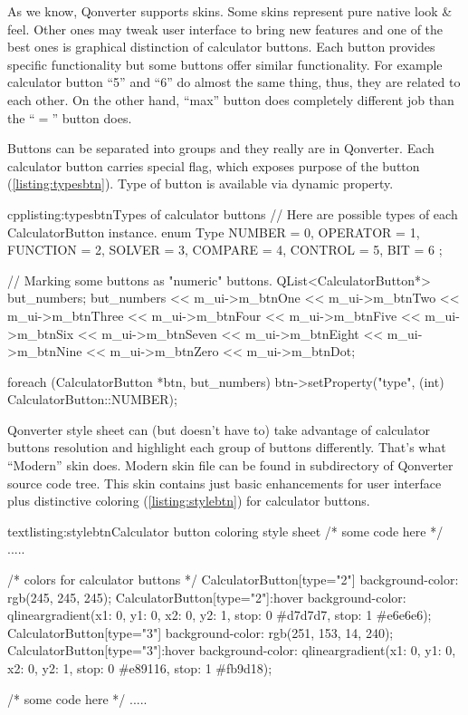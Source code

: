 As we know, Qonverter supports skins. Some skins represent pure native look \& feel. Other ones may tweak user interface to bring new features and one of the best ones is graphical distinction of calculator buttons. Each button provides specific functionality but some buttons offer similar functionality. For example calculator button \enquote{5} and \enquote{6} do almost the same thing, thus, they are related to each other. On the other hand, \enquote{max} button does completely different job than the \enquote{$=$} button does.

Buttons can be separated into groups and they really are in Qonverter. Each calculator button carries special flag, which exposes purpose of the button (\autoref{listing:typesbtn}). Type of button is available via dynamic property.
\begin{fdoccode}{cpp}{listing:typesbtn}{Types of calculator buttons}
// Here are possible types of each CalculatorButton instance.
enum Type {
    NUMBER	= 0,
    OPERATOR	= 1,
    FUNCTION	= 2,
    SOLVER	= 3,
    COMPARE	= 4,
    CONTROL	= 5,
    BIT		= 6
};

// Marking some buttons as "numeric" buttons.
QList<CalculatorButton*> but_numbers;
but_numbers <<	m_ui->m_btnOne << m_ui->m_btnTwo <<
				m_ui->m_btnThree << m_ui->m_btnFour <<
				m_ui->m_btnFive << m_ui->m_btnSix <<
				m_ui->m_btnSeven << m_ui->m_btnEight <<
				m_ui->m_btnNine << m_ui->m_btnZero <<
				m_ui->m_btnDot;

foreach (CalculatorButton *btn, but_numbers) {
	btn->setProperty("type", (int) CalculatorButton::NUMBER);
}
\end{fdoccode}

Qonverter style sheet can (but doesn't have to) take advantage of calculator buttons resolution and highlight each group of buttons differently. That's what \enquote{Modern} skin does. Modern skin file can be found in subdirectory of Qonverter source code tree. This skin contains just basic enhancements for user interface plus distinctive coloring (\autoref{listing:stylebtn}) for calculator buttons.
\begin{fdoccode}{text}{listing:stylebtn}{Calculator button coloring style sheet}
/* some code here */
.....

/* colors for calculator buttons */
CalculatorButton[type="2"] {
    background-color: rgb(245, 245, 245);
}
CalculatorButton[type="2"]:hover {
    background-color: qlineargradient(x1: 0, y1: 0, x2: 0, y2: 1, stop: 0 #d7d7d7, stop: 1 #e6e6e6);
}
CalculatorButton[type="3"] {
    background-color: rgb(251, 153, 14, 240);
}
CalculatorButton[type="3"]:hover {
    background-color: qlineargradient(x1: 0, y1: 0, x2: 0, y2: 1, stop: 0 #e89116, stop: 1 #fb9d18);
}

/* some code here */
.....
\end{fdoccode}

